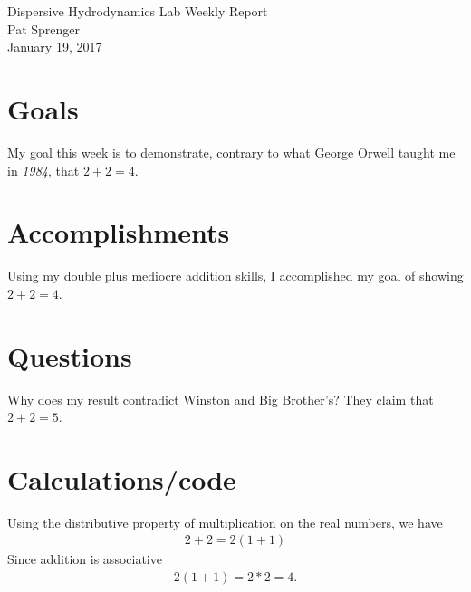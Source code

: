 \documentclass[12 pt]{article}
\newcommand{\theDate}{January 19, 2017} %
\newcommand{\yourName}{Pat Sprenger} %
\begin{document}
\begin{center}
Dispersive Hydrodynamics Lab Weekly Report \\
\yourName\\
\theDate
\end{center}

\section*{Goals} %

My goal this week is to demonstrate, contrary to what George Orwell taught me in \textit{1984}, that $2+2 = 4.$

\section*{Accomplishments}

Using my double plus mediocre addition skills, I accomplished my goal of showing $2+2 = 4$.

\section*{Questions} %

Why does my result contradict Winston and Big Brother's? They claim that $2+2 = 5$.

\section*{Calculations/code}
Using the distributive property of multiplication on the real numbers, we have
\begin{align*}
2+2 = 2(1+1)
\end{align*}
Since addition is associative
\begin{align*}
2(1+1) = 2*2 = 4.
\end{align*}
\end{document}
